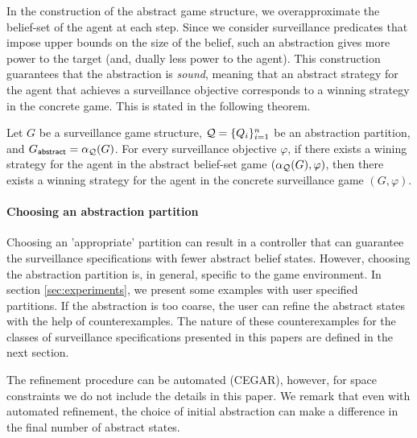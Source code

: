 In the construction of the abstract  game structure, we overapproximate the belief-set of the agent at each step. Since we consider surveillance predicates that impose upper bounds on the size of the belief, such an abstraction  gives more power to the target (and, dually less power to the agent).  This construction guarantees that the abstraction is \emph{sound}, meaning that an abstract strategy for the agent that achieves a surveillance objective corresponds to a winning strategy in the concrete game. This is stated in the following theorem.

\begin{theorem}
Let $G$ be a surveillance game structure, $\mathcal{Q} = \{Q_i\}_{i=1}^n$ be an abstraction partition, and $G_{\mathsf{abstract}} = \alpha_{\mathcal{Q}}(G)$. For every surveillance objective $\varphi$, if there exists a wining strategy for the agent in the abstract belief-set game $(\alpha_{\mathcal{Q}}(G),\varphi)$, then there exists a winning strategy for the agent in the concrete surveillance game $(G,\varphi)$.
\end{theorem}

\paragraph{Choosing an abstraction partition} Choosing an 'appropriate' partition can result in a controller that can guarantee the surveillance specifications with fewer abstract belief states. However, choosing the abstraction partition is, in general, specific to the game environment. In section \ref{sec:experiments}, we present some examples with user specified partitions. If the abstraction is too coarse, the user can refine the abstract states with the help of counterexamples. The nature of these counterexamples for the classes of surveillance specifications presented in this papers are defined in the next section.

The refinement procedure can be automated (CEGAR), however, for space constraints we do not include the details in this paper. We remark that even with automated refinement, the choice of initial abstraction can make a difference in the final number of abstract states.
